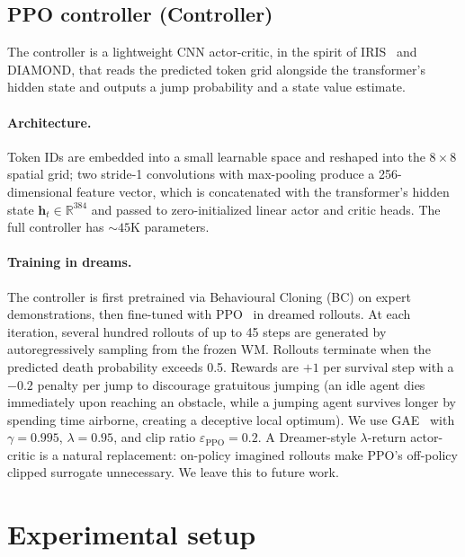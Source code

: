 \documentclass{article}
\newcommand{\hdim}{384}
\newcommand{\gridsize}{8 \times 8}
\newcommand{\ctrlparams}{\sim\!45\text{K}}
\begin{document}
\subsection{PPO controller (Controller)}
\label{sec:controller}

The controller is a lightweight CNN actor-critic, in the spirit of IRIS~\citep{micheli2023iris} and DIAMOND, that reads the predicted token grid alongside the transformer's hidden state and outputs a jump probability and a state value estimate.

\paragraph{Architecture.}
Token IDs are embedded into a small learnable space and reshaped into the $\gridsize$ spatial grid; two stride-1 convolutions with max-pooling produce a 256-dimensional feature vector, which is concatenated with the transformer's hidden state $\mathbf{h}_t \in \mathbb{R}^{\hdim}$ and passed to zero-initialized linear actor and critic heads.
The full controller has $\ctrlparams$ parameters.

\paragraph{Training in dreams.}
The controller is first pretrained via Behavioural Cloning (BC) on expert demonstrations, then fine-tuned with PPO~\citep{schulman2017ppo} in dreamed rollouts.
At each iteration, several hundred rollouts of up to 45 steps are generated by autoregressively sampling from the frozen WM.
Rollouts terminate when the predicted death probability exceeds 0.5.
Rewards are $+1$ per survival step with a $-0.2$ penalty per jump to discourage gratuitous jumping (an idle agent dies immediately upon reaching an obstacle, while a jumping agent survives longer by spending time airborne, creating a deceptive local optimum).
We use GAE~\citep{schulman2017ppo} with $\gamma = 0.995$, $\lambda = 0.95$, and clip ratio $\varepsilon_\text{PPO} = 0.2$.
A Dreamer-style $\lambda$-return actor-critic is a natural replacement: on-policy imagined rollouts make PPO's off-policy clipped surrogate unnecessary.
We leave this to future work.

\section{Experimental setup}
\label{sec:setup}
\end{document}
